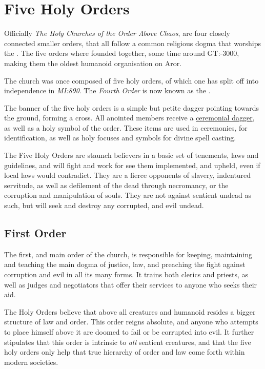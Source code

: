 \section{Five Holy Orders}
\label{sec:Five Holy Orders}

Officially \emph{The Holy Churches of the Order Above Chaos}, are four closely
connected smaller orders, that all follow a common religious dogma that
worships the . The five orders where founded together, some
time around GT:-3000, making them the oldest humanoid organisation on Aror.

The church was once composed of five holy orders, of which one has split off
into independence in \emph{MI:890}. The \emph{Fourth Order} is now known as
the .


The banner of the five holy orders is a simple but petite dagger pointing
towards the ground, forming a cross. All anointed members receive a
\hyperref[sec:Dagger of the Order]{ceremonial dagger}, as well as a holy
symbol of the order. These items are used in ceremonies, for identification,
as well as holy focuses and symbols for divine spell casting.

The Five Holy Orders are staunch believers in a basic set of tenements, laws
and guidelines, and will fight and work for see them implemented, and upheld,
even if local laws would contradict. They are a fierce opponents of slavery,
indentured servitude, as well as defilement of the dead through necromancy, or
the corruption and manipulation of souls. They are not against sentient undead
as such, but will seek and destroy any corrupted, and evil undead.

\subsection{First Order}
\label{sec:First Order}

The first, and main order of the church, is responsible for keeping, maintaining
and teaching the main dogma of justice, law, and preaching the fight against
corruption and evil in all its many forms. It trains both clerics and priests,
as well as judges and negotiators that offer their services to anyone who
seeks their aid.

The Holy Orders believe that above all creatures and humanoid resides a bigger
structure of law and order. This order reigns absolute, and anyone who attempts
to place himself above it are doomed to fail or be corrupted into evil. It
further stipulates that this order is intrinsic to \emph{all} sentient
creatures, and that the five holy orders only help that true hierarchy of order
and law come forth within modern societies.

